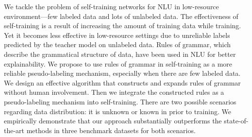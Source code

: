 We tackle the problem of self-training networks for NLU in low-resource environment---few labeled data and lots of unlabeled data. The effectiveness of self-training is a result of increasing the amount of training data while training. Yet it becomes less effective in low-resource settings due to unreliable labels predicted by the teacher model on unlabeled data. Rules of grammar, which describe the grammatical structure of data, have been used in NLU for better explainability. We propose to use rules of grammar in self-training as a more reliable pseudo-labeling mechanism, especially when there are few labeled data. We design an effective algorithm that constructs and expands rules of grammar without human involvement. Then  we integrate the constructed rules as a pseudo-labeling mechanism into self-training. There are two possible scenarios regarding data distribution: it is unknown or known in prior to training. We empirically demonstrate that our approach substantially outperforms the state-of-the-art methods in three benchmark datasets for both scenarios.
